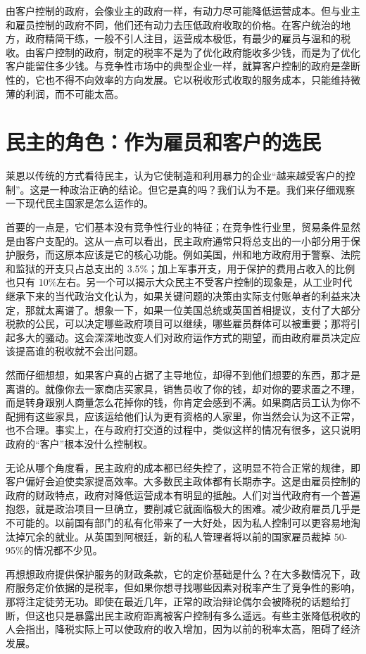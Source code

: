 由客户控制的政府，会像业主的政府一样，有动力尽可能降低运营成本。但与业主和雇员控制的政府不同，他们还有动力去压低政府收取的价格。在客户统治的地方，政府精简干练，一般不引人注目，运营成本极低，有最少的雇员与温和的税收。由客户控制的政府，制定的税率不是为了优化政府能收多少钱，而是为了优化客户能留住多少钱。与竞争性市场中的典型企业一样，就算客户控制的政府是垄断性的，它也不得不向效率的方向发展。它以税收形式收取的服务成本，只能维持微薄的利润，而不可能太高。

\section{民主的角色：作为雇员和客户的选民}
莱恩以传统的方式看待民主，认为它使制造和利用暴力的企业“越来越受客户的控制”。这是一种政治正确的结论。但它是真的吗？我们认为不是。我们来仔细观察一下现代民主国家是怎么运作的。

首要的一点是，它们基本没有竞争性行业的特征；在竞争性行业里，贸易条件显然是由客户支配的。这从一点可以看出，民主政府通常只将总支出的一小部分用于保护服务，而这原本应该是它的核心功能。例如美国，州和地方政府用于警察、法院和监狱的开支只占总支出的 3.5\%；加上军事开支，用于保护的费用占收入的比例也只有 10\%左右。另一个可以揭示大众民主不受客户控制的现象是，从工业时代继承下来的当代政治文化认为，如果关键问题的决策由实际支付账单者的利益来决定，那就太离谱了。想象一下，如果一位美国总统或英国首相提议，支付了大部分税款的公民，可以决定哪些政府项目可以继续，哪些雇员群体可以被重要；那将引起多大的骚动。这会深深地改变人们对政府运作方式的期望，而由政府雇员决定应该提高谁的税收就不会出问题。

然而仔细想想，如果客户真的占据了主导地位，却得不到他们想要的东西，那才是离谱的。就像你去一家商店买家具，销售员收了你的钱，却对你的要求置之不理，而是转身跟别人商量怎么花掉你的钱，你肯定会感到不满。如果商店员工认为你不配拥有这些家具，应该运给他们认为更有资格的人家里，你当然会认为这不正常，也不合理。事实上，在与政府打交道的过程中，类似这样的情况有很多，这只说明政府的“客户”根本没什么控制权。

无论从哪个角度看，民主政府的成本都已经失控了，这明显不符合正常的规律，即客户偏好会迫使卖家提高效率。大多数民主政体都有长期赤字。这是由雇员控制的政府的财政特点，政府对降低运营成本有明显的抵触。人们对当代政府有一个普遍抱怨，就是政治项目一旦确立，要削减它就面临极大的困难。减少政府雇员几乎是不可能的。以前国有部门的私有化带来了一大好处，因为私人控制可以更容易地淘汰掉冗余的就业。从英国到阿根廷，新的私人管理者将以前的国家雇员裁掉 50-95\%的情况都不少见。

再想想政府提供保护服务的财政条款，它的定价基础是什么？在大多数情况下，政府服务定价依据的是税率，但如果你想寻找哪些因素对税率产生了竞争性的影响，那将注定徒劳无功。即使在最近几年，正常的政治辩论偶尔会被降税的话题给打断，但这也只是暴露出民主政府距离被客户控制有多么遥远。有些主张降低税收的人会指出，降税实际上可以使政府的收入增加，因为以前的税率太高，阻碍了经济发展。

